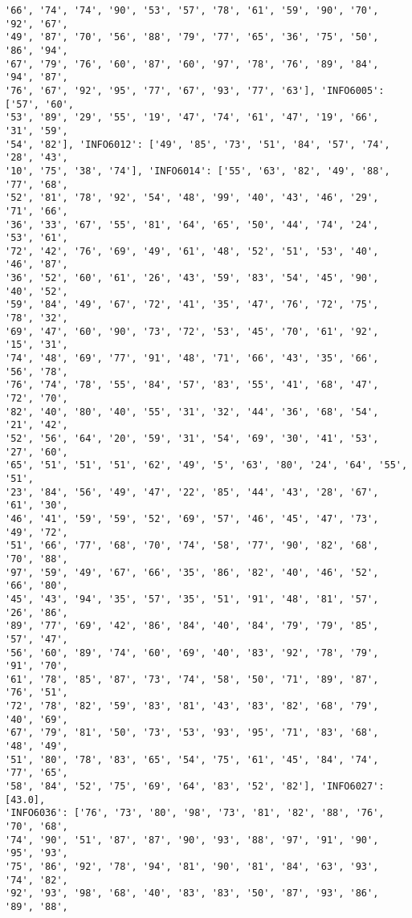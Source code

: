 \documentclass[11pt]{article}
\begin{document}
\begin{Verbatim}[commandchars=\\\{\}]
'66', '74', '74', '90', '53', '57', '78', '61', '59', '90', '70', '92', '67',
'49', '87', '70', '56', '88', '79', '77', '65', '36', '75', '50', '86', '94',
'67', '79', '76', '60', '87', '60', '97', '78', '76', '89', '84', '94', '87',
'76', '67', '92', '95', '77', '67', '93', '77', '63'], 'INFO6005': ['57', '60',
'53', '89', '29', '55', '19', '47', '74', '61', '47', '19', '66', '31', '59',
'54', '82'], 'INFO6012': ['49', '85', '73', '51', '84', '57', '74', '28', '43',
'10', '75', '38', '74'], 'INFO6014': ['55', '63', '82', '49', '88', '77', '68',
'52', '81', '78', '92', '54', '48', '99', '40', '43', '46', '29', '71', '66',
'36', '33', '67', '55', '81', '64', '65', '50', '44', '74', '24', '53', '61',
'72', '42', '76', '69', '49', '61', '48', '52', '51', '53', '40', '46', '87',
'36', '52', '60', '61', '26', '43', '59', '83', '54', '45', '90', '40', '52',
'59', '84', '49', '67', '72', '41', '35', '47', '76', '72', '75', '78', '32',
'69', '47', '60', '90', '73', '72', '53', '45', '70', '61', '92', '15', '31',
'74', '48', '69', '77', '91', '48', '71', '66', '43', '35', '66', '56', '78',
'76', '74', '78', '55', '84', '57', '83', '55', '41', '68', '47', '72', '70',
'82', '40', '80', '40', '55', '31', '32', '44', '36', '68', '54', '21', '42',
'52', '56', '64', '20', '59', '31', '54', '69', '30', '41', '53', '27', '60',
'65', '51', '51', '51', '62', '49', '5', '63', '80', '24', '64', '55', '51',
'23', '84', '56', '49', '47', '22', '85', '44', '43', '28', '67', '61', '30',
'46', '41', '59', '59', '52', '69', '57', '46', '45', '47', '73', '49', '72',
'51', '66', '77', '68', '70', '74', '58', '77', '90', '82', '68', '70', '88',
'97', '59', '49', '67', '66', '35', '86', '82', '40', '46', '52', '66', '80',
'45', '43', '94', '35', '57', '35', '51', '91', '48', '81', '57', '26', '86',
'89', '77', '69', '42', '86', '84', '40', '84', '79', '79', '85', '57', '47',
'56', '60', '89', '74', '60', '69', '40', '83', '92', '78', '79', '91', '70',
'61', '78', '85', '87', '73', '74', '58', '50', '71', '89', '87', '76', '51',
'72', '78', '82', '59', '83', '81', '43', '83', '82', '68', '79', '40', '69',
'67', '79', '81', '50', '73', '53', '93', '95', '71', '83', '68', '48', '49',
'51', '80', '78', '83', '65', '54', '75', '61', '45', '84', '74', '77', '65',
'58', '84', '52', '75', '69', '64', '83', '52', '82'], 'INFO6027': [43.0],
'INFO6036': ['76', '73', '80', '98', '73', '81', '82', '88', '76', '70', '68',
'74', '90', '51', '87', '87', '90', '93', '88', '97', '91', '90', '95', '93',
'75', '86', '92', '78', '94', '81', '90', '81', '84', '63', '93', '74', '82',
'92', '93', '98', '68', '40', '83', '83', '50', '87', '93', '86', '89', '88',

\end{Verbatim}
\end{document}

